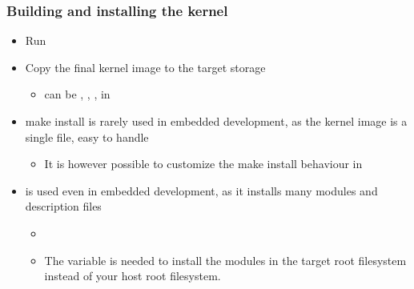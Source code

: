 \begin{frame}
  \frametitle{Building and installing the kernel}
  \begin{itemize}
  \item Run 
  \item Copy the final kernel image to the target storage
    \begin{itemize}
    \item can be , , ,
       in 
    \end{itemize}
  \item make install is rarely used in embedded development, as the
    kernel image is a single file, easy to handle
    \begin{itemize}
    \item It is however possible to customize the make install
      behaviour in 
    \end{itemize}
  \item {} is used even in embedded
    development, as it installs many modules and description files
    \begin{itemize}
    \item {}
    \item The  variable is needed to install
      the modules in the target root filesystem instead of your host
      root filesystem.
    \end{itemize}
  \end{itemize}
\end{frame}

